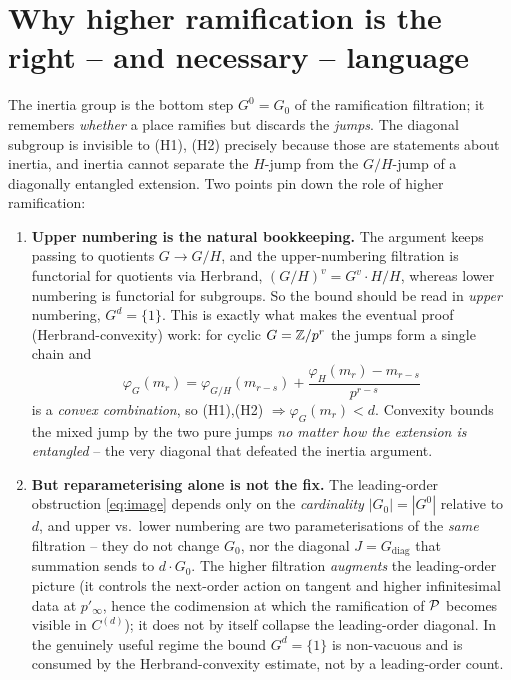 \documentclass[11pt]{article}
\begin{document}
\section{Why higher ramification is the right -- and necessary -- language}\label{sec:higher}

The inertia group is the bottom step $G^0=G_0$ of the ramification filtration;
it remembers \emph{whether} a place ramifies but discards the \emph{jumps}. The
diagonal subgroup is invisible to (H1), (H2) precisely because those are
statements about inertia, and inertia cannot separate the $H$-jump from the
$G/H$-jump of a diagonally entangled extension. Two points pin down the role of
higher ramification:

\begin{enumerate}
  \item \textbf{Upper numbering is the natural bookkeeping.} The argument keeps
        passing to quotients $G\to G/H$, and the upper-numbering filtration is
        functorial for quotients via Herbrand, $(G/H)^v=G^v\cdot H/H$, whereas
        lower numbering is functorial for subgroups. So the bound should be read
        in \emph{upper} numbering, $G^d=\{1\}$. This is exactly what makes the
        eventual proof (Herbrand-convexity) work: for cyclic $G=\mathbb{Z}/p^r$ the
        jumps form a single chain and
        \[
        \varphi_G(m_r)=\varphi_{G/H}(m_{r-s})+\frac{\varphi_H(m_r)-m_{r-s}}{p^{r-s}}
        \]
        is a \emph{convex combination}, so (H1),(H2) $\Rightarrow\varphi_G(m_r)<d$.
        Convexity bounds the mixed jump by the two pure jumps \emph{no matter
        how the extension is entangled} -- the very diagonal that defeated the
        inertia argument.
  \item \textbf{But reparameterising alone is not the fix.} The leading-order
        obstruction \cref{eq:image} depends only on the \emph{cardinality}
        $|G_0|=|G^0|$ relative to $d$, and upper vs.\ lower numbering are two
        parameterisations of the \emph{same} filtration -- they do not change
        $G_0$, nor the diagonal $J=G_{\mathrm{diag}}$ that summation sends to
        $d\cdot G_0$. The higher filtration \emph{augments} the leading-order
        picture (it controls the next-order action on tangent and higher
        infinitesimal data at $p'_\infty$, hence the codimension at which the
        ramification of $\mathcal{P}$ becomes visible in $C^{(d)}$); it does not by
        itself collapse the leading-order diagonal. In the genuinely useful
        regime the bound $G^d=\{1\}$ is non-vacuous and is consumed by the
        Herbrand-convexity estimate, not by a leading-order count.
\end{enumerate}
\end{document}
